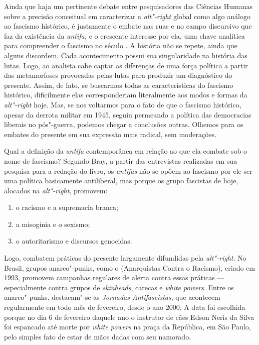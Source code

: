 Ainda que haja um pertinente debate entre pesquisadores das Ciências
Humanas sobre a precisão conceitual em caracterizar a \emph{alt"-right}
global como algo análogo ao fascismo histórico, é justamente o embate
nas ruas e no campo discursivo que faz da existência da \emph{antifa,} e
o crescente interesse por ela, uma chave analítica para compreender o
fascismo no século . A história não se repete, ainda que alguns
discordem. Cada acontecimento possui sua singularidade na história das
lutas. Logo, ao analista cabe captar as diferenças de uma força política
a partir das metamorfoses provocadas pelas lutas para produzir um
diagnóstico do presente. Assim, de fato, se buscarmos todas as
características do fascismo histórico, dificilmente elas corresponderiam
literalmente aos modos e formas da \emph{alt"-right} hoje. Mas, se nos
voltarmos para o fato de que o fascismo histórico, apesar da derrota
militar em 1945, seguiu permeando a política das democracias liberais no %
pós"-guerra, podemos chegar a conclusões outras. Olhemos para os embates
do presente em sua expressão mais radical, sem moderações.

Qual a definição da \emph{antifa} contemporânea em relação ao que ela
combate sob o nome de fascismo? Segundo Bray, a partir das entrevistas
realizadas em sua pesquisa para a redação do livro, os \emph{antifas}
não se opõem ao fascismo por ele ser uma política basicamente
antiliberal, mas porque os grupo fascistas de hoje, alocados na
\emph{alt"-right}, promovem:
\begin{enumerate}
\item{} o racismo e a supremacia branca;
\item{} a misoginia e o sexismo;
\item{} o autoritarismo e discursos genocidas.
\end{enumerate}
Logo,
combatem práticas do presente largamente difundidas pela
\emph{alt"-right}. No Brasil, grupos anarco"-punks, como o 
(Anarquistas Contra o Racismo), criado em 1993, promovem campanhas
regulares de alerta contra essas práticas --- especialmente contra grupos
de \emph{skinheads}, carecas e \emph{white powers}. Entre os
anarco"-punks, destacam"-se as \emph{Jornadas Antifascistas}, que
acontecem regularmente em todo mês de fevereiro, desde o ano 2000. A data
foi escolhida porque no dia 6 de fevereiro daquele ano o instrutor de
cães Edson Neris da Silva foi espancado até morte por \emph{white
powers} na praça da República, em São Paulo, pelo simples fato de estar
de mãos dadas com seu namorado.

